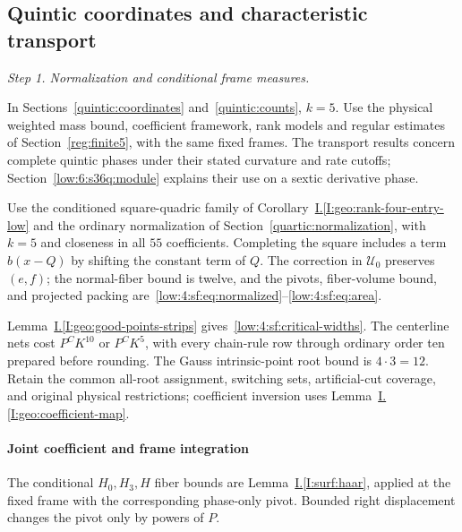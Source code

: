 \documentclass[11pt]{amsart}
\theoremstyle{definition}
\theoremstyle{remark}
\numberwithin{equation}{section}
\newcommand{\partIref}[1]{\hyperref[I:#1]{I.\ref*{I:#1}}}
\begin{document}
\subsection{Quintic coordinates and characteristic transport}\label{low:degree5}\label{quintic:coordinates}\label{low:5:qsf:normalization}\label{low:5:qsf:sec:packing}\label{low:5:qsf:preparation}\label{low:5:qsf:sec:gauss}\label{low:5:qsf:null-incidence-section}\label{low:5:qsf:sec:affinearea}\label{low:5:qsc:atlas}\label{low:5:qsc:nonnull}\label{low:5:qsc:reconstruction}\label{quintic:transport}\label{low:5:qnt:section}\label{low:5:qng:section}

\par\smallskip\noindent\textit{Step 1. Normalization and conditional frame measures.}\par\nobreak\smallskip

In Sections~\ref{quintic:coordinates} and~\ref{quintic:counts}, $k=5$. Use the physical weighted mass bound, coefficient framework, rank models and regular estimates of Section~\ref{reg:finite5}, with the same fixed frames. The transport results concern complete quintic phases under their stated curvature and rate cutoffs; Section~\ref{low:6:s36q:module} explains their use on a sextic derivative phase.

Use the conditioned square-quadric family of Corollary~\partIref{geo:rank-four-entry-low} and the ordinary normalization of Section~\ref{quartic:normalization}, with $k=5$ and closeness in all $55$ coefficients. Completing the square includes a term $b(x-Q)$ by shifting the constant term of $Q$. The correction in $\mathcal U_0$ preserves $(e,f)$; the normal-fiber bound is twelve, and the pivots, fiber-volume bound, and projected packing are~\eqref{low:4:sf:eq:normalized}--\eqref{low:4:sf:eq:area}.

Lemma~\partIref{geo:good-points-strips} gives~\eqref{low:4:sf:critical-widths}. The centerline nets cost $P^CK^{10}$ or $P^CK^5$, with every chain-rule row through ordinary order ten prepared before rounding. The Gauss intrinsic-point root bound is $4\cdot3=12$. Retain the common all-root assignment, switching sets, artificial-cut coverage, and original physical restrictions; coefficient inversion uses Lemma~\partIref{geo:coefficient-map}.

\paragraph{Joint coefficient and frame integration}
The conditional $H_0,H_3,H$ fiber bounds are Lemma~\partIref{surf:haar}, applied at the fixed frame with the corresponding phase-only pivot. Bounded right displacement changes the pivot only by powers of $P$.
\end{document}
